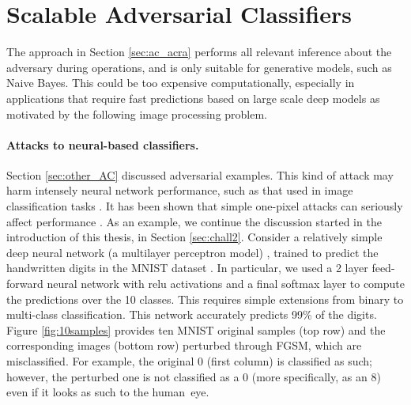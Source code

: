 \section{Scalable Adversarial Classifiers}\label{sec:scalable}
%
The approach in Section \ref{sec:ac_acra} performs all relevant inference about the adversary during operations, and is only suitable for generative models, such as Naive Bayes. This could be too expensive computationally, especially in applications that require fast predictions
based on large scale deep models as motivated by the following image
processing problem.


\paragraph{Attacks to neural-based classifiers.}
Section \ref{sec:other_AC} discussed adversarial examples.  This kind of attack may harm intensely neural
network performance, such as that used in image classification tasks \parencite{szegedy2013intriguing}. It has been shown that simple one-pixel attacks can seriously affect performance \parencite{su2019one}.
As an example, we continue the discussion started in the introduction of this thesis, in Section \ref{sec:chall2}. Consider 
a relatively simple deep neural network (a multilayer perceptron model) \parencite{10.5555/3086952}, trained to predict the handwritten digits in the MNIST dataset \parencite{MNIST}. In particular, we used a 2 layer feed-forward neural network with relu activations and a final softmax layer to compute the predictions over the 10 classes. This requires simple extensions from binary to multi-class classification. This network accurately predicts 99\% of the digits. Figure \ref{fig:10samples} provides ten MNIST original 
samples (top row) and the corresponding images (bottom row) perturbed through FGSM,
which are misclassified. For example, the original 0 
(first column) is classified
as such; however, the perturbed one
is not classified as a 0 (more specifically, as an 8) even if it looks as such to the human~eye.%



